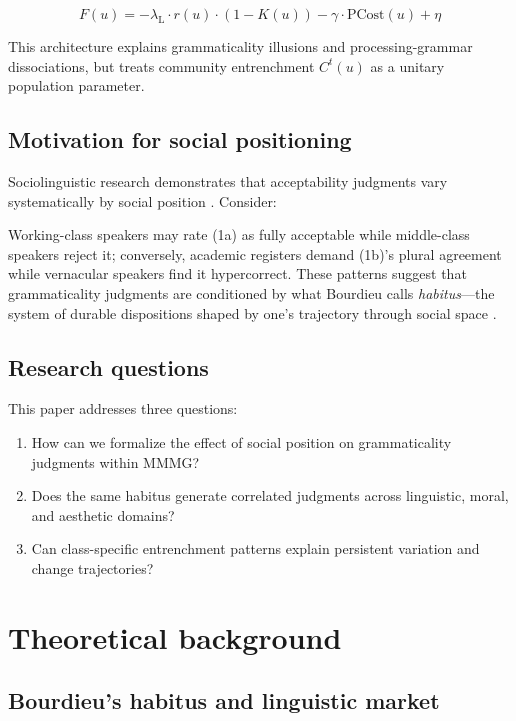 \documentclass[12pt]{article}
\newcommand{\listener}{\mathrm{L}}
\begin{document}
\begin{equation}
F(u) = -\lambda_{\listener} \cdot r(u) \cdot (1-K(u)) - \gamma \cdot \text{PCost}(u) + \eta
\end{equation}

This architecture explains grammaticality illusions and processing-grammar dissociations, but treats community entrenchment $C^t(u)$ as a unitary population parameter.

\subsection{Motivation for social positioning}

Sociolinguistic research demonstrates that acceptability judgments vary systematically by social position \parencite{labov1972,preston1989,adli2004}. Consider:

\ea
{}
\z\z

Working-class speakers may rate (1a) as fully acceptable while middle-class speakers reject it; conversely, academic registers demand (1b)'s plural agreement while vernacular speakers find it hypercorrect. These patterns suggest that grammaticality judgments are conditioned by what Bourdieu calls \emph{habitus}—the system of durable dispositions shaped by one's trajectory through social space \parencite{bourdieu1991language}.

\subsection{Research questions}

This paper addresses three questions:
\begin{enumerate}
\item How can we formalize the effect of social position on grammaticality judgments within MMMG?
\item Does the same habitus generate correlated judgments across linguistic, moral, and aesthetic domains?
\item Can class-specific entrenchment patterns explain persistent variation and change trajectories?
\end{enumerate}

\section{Theoretical background}

\subsection{Bourdieu's habitus and linguistic market}
\end{document}
